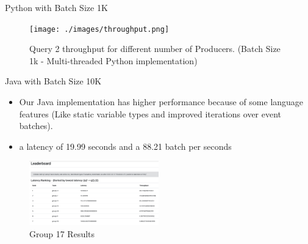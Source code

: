 \documentclass[9pt]{beamer}
\begin{document}
\begin{frame}[fragile]{Python with Batch Size 1K  }
    
    \begin{figure}
        \begin{center}
            \texttt{[image: ./images/throughput.png]}
            \caption{Query 2 throughput for different number of Producers. (Batch Size 1k - Multi-threaded Python implementation) }
            \label{fig:evaluation}
        \end{center}
    \end{figure}
\end{frame}







\begin{frame}[fragile]{Java with Batch Size 10K  }
    \begin{itemize}
        \item Our Java implementation has higher performance because of some language features (Like static variable types and improved iterations over event batches).
        \item  a latency of 19.99 seconds and a 88.21 batch per seconds
    \end{itemize}

    

    
    \begin{figure}[]
        \begin{center}
            \includegraphics[width=0.5\textwidth]{../DEBS2022-2022-05-28-Throuput.png}
            \caption{Group 17 Results }
            \label{fig:evaluation}
        \end{center}
    \end{figure}
    
\end{frame}
\end{document}
